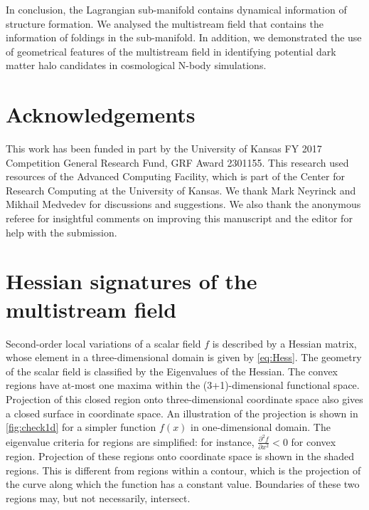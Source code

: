\documentclass[fleqn,usenatbib,useAMS]{mnras}
\begin{document}
In conclusion, the Lagrangian sub-manifold contains dynamical information of structure formation. We analysed the multistream field that contains the information of foldings in the sub-manifold. In addition, we demonstrated the use of geometrical features of the multistream field in identifying potential dark matter halo candidates in cosmological N-body simulations. 


\section*{Acknowledgements}

This work has been funded in part by the University of Kansas FY 2017 Competition General Research Fund, GRF Award 2301155. This research used resources of the Advanced Computing Facility, which is part of the Center for Research Computing at the University of Kansas. We thank Mark Neyrinck and Mikhail Medvedev for discussions and suggestions. We also thank the anonymous referee for insightful comments on improving this manuscript and the editor for help with the submission. 





\appendix

\section{Hessian signatures of the multistream field}
\label{appendix:Eigen}


Second-order local variations of a scalar field $f$ is described by a Hessian matrix, whose element in a three-dimensional domain is given by \autoref{eq:Hess}. The geometry of the scalar field is classified by the Eigenvalues of the Hessian. The convex regions have at-most one maxima within the (3+1)-dimensional functional space. Projection of this closed region onto three-dimensional coordinate space also gives a closed surface in coordinate space. An illustration of the projection is shown in \autoref{fig:check1d} for a simpler function $f(x)$ in one-dimensional domain. The eigenvalue criteria for regions are simplified: for instance, $\frac{\partial^2 f}{\partial x^2} < 0$ for convex region. Projection of these regions onto coordinate space is shown in the shaded regions. This is different from regions within a contour, which is the projection of the curve along which the function has a constant value. Boundaries of these two regions may, but not necessarily, intersect. 
\end{document}
